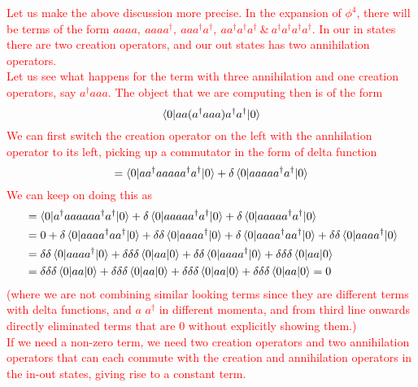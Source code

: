\documentclass[11pt, notitlepage]{report}
\newcommand{\adag}[1]{a^\dagger_\mathbf{#1}}
\numberwithin{equation}{section}
\begin{document}
    \textcolor{red}{
        Let us make the above discussion more precise. 
        In the expansion of \(\phi^4\), there will be terms of the form \(aaaa,~aaaa^\dagger,~ aaa^\dagger a^\dagger,~ aa^\dagger a^\dagger a^\dagger~\&~a^\dagger a^\dagger a^\dagger a^\dagger\). In our in states there are two creation operators, and our out states has two annihilation operators. \\
        Let us see what happens for the term with three annihilation and one creation operators, say \(a^\dagger a a a\).  The object that we are computing then is of the form 
        \begin{equation*}
            \braket{0|aa(a^\dagger aaa)a^\dagger a^\dagger |0}
        \end{equation*}
        We can first switch the creation operator on the left with the annhilation operator to its left, picking up a commutator in the form of delta function 
        \begin{equation*}
            = \braket{0|aa^\dagger aaaaa^\dagger a^\dagger |0} + \delta \braket{0|aaaaa^\dagger a^\dagger |0}
        \end{equation*}
        We can keep on doing this as 
        \begin{align*}
            &= \braket{0|a^\dagger aaaaaa^\dagger a^\dagger |0} + \delta\braket{0|aaaaa^\dagger a^\dagger |0}  + \delta \braket{0|aaaaa^\dagger a^\dagger |0}\\ 
            &= 0 + \delta\braket{0|aaaa^\dagger a a^\dagger |0} + \delta\delta \braket{0|aaa a^\dagger |0}  + \delta\braket{0|aaaa^\dagger a a^\dagger |0} + \delta\delta \braket{0|aaa a^\dagger |0} \\
            & = \delta\delta\braket{0|aaaa^\dagger|0} + \delta\delta\delta \braket{0|aa|0}  + \delta\delta\braket{0|aaaa^\dagger|0} + \delta\delta\delta \braket{0|aa|0}  \\
            & = \delta\delta\delta \braket{0|aa|0} + \delta\delta\delta \braket{0|aa|0}+\delta\delta\delta \braket{0|aa|0}+\delta\delta\delta \braket{0|aa|0} = 0
        \end{align*}
        (where we are not combining similar looking terms since they are different terms with delta functions, and \(a\) \(\adag{~}\) in different momenta, and from third line onwards directly eliminated terms that are 0 without explicitly showing them.)\\
        If we need a non-zero term, we need two creation operators and two annihilation operators that can each commute with the creation and annihilation operators in the in-out states, giving rise to a constant term. \\
}
\end{document}
